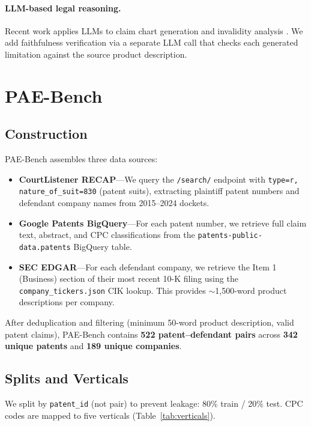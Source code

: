 \documentclass[11pt]{article}
\begin{document}
\paragraph{LLM-based legal reasoning.} Recent work applies LLMs to claim chart generation \citep{trautman2023} and invalidity analysis \citep{silbey2024}. We add faithfulness verification via a separate LLM call that checks each generated limitation against the source product description.

\section{PAE-Bench}

\subsection{Construction}

PAE-Bench assembles three data sources:

\begin{itemize}
    \item \textbf{CourtListener RECAP}---We query the \texttt{/search/} endpoint with \texttt{type=r, nature\_of\_suit=830} (patent suits), extracting plaintiff patent numbers and defendant company names from 2015--2024 dockets.
    \item \textbf{Google Patents BigQuery}---For each patent number, we retrieve full claim text, abstract, and CPC classifications from the \texttt{patents-public-data.patents} BigQuery table.
    \item \textbf{SEC EDGAR}---For each defendant company, we retrieve the Item 1 (Business) section of their most recent 10-K filing using the \texttt{company\_tickers.json} CIK lookup. This provides $\sim$1{,}500-word product descriptions per company.
\end{itemize}

After deduplication and filtering (minimum 50-word product description, valid patent claims), PAE-Bench contains \textbf{522 patent--defendant pairs} across \textbf{342 unique patents} and \textbf{189 unique companies}.

\subsection{Splits and Verticals}

We split by \texttt{patent\_id} (not pair) to prevent leakage: 80\% train / 20\% test. CPC codes are mapped to five verticals (Table~\ref{tab:verticals}).
\end{document}
